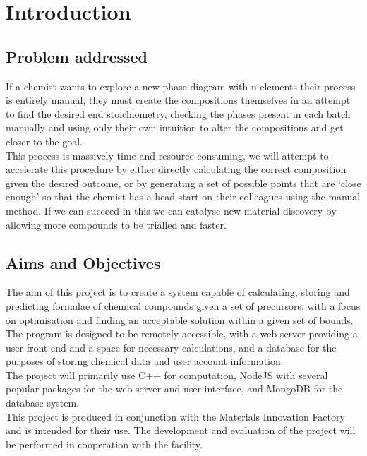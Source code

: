 \chapter{Introduction}
\label{ch:intro}

\section{Problem addressed}
If a chemist wants to explore a new phase diagram with n elements their process is entirely manual, they must create the compositions themselves in an attempt to find the desired end stoichiometry, checking the phases present in each batch manually and using only their own intuition to alter the compositions and get closer to the goal. \\

This process is massively time and resource consuming, we will attempt to accelerate this procedure by either directly calculating the correct composition given the desired outcome, or by generating a set of possible points that are `close enough' so that the chemist has a head-start on their colleagues using the manual method. If we can succeed in this we can catalyse new material discovery by allowing more compounds to be trialled and faster. 

\section{Aims and Objectives}
The aim of this project is to create a system capable of calculating, storing and predicting formulae of chemical compounds given a set of precursors, with a focus on optimisation and finding an acceptable solution within a given set of bounds. The program is designed to be remotely accessible, with a web server providing a user front end and a space for necessary calculations, and a database for the purposes of storing chemical data and user account information. \\

The project will primarily use C++ for computation, NodeJS with several popular packages for the web server and user interface, and MongoDB for the database system. \\

This project is produced in conjunction with the Materials Innovation Factory and is intended for their use. The development and evaluation of the project will be performed in cooperation with the facility. \\

